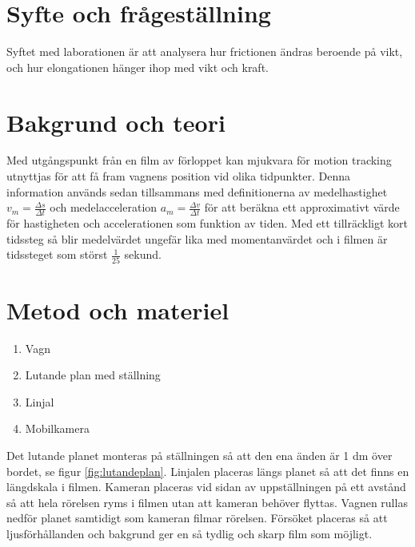 \documentclass[11p, titlepage, oneside, a4paper]{article}
\begin{document}
	\newpage

	
	\setlength{\parindent}{0pt}
	\setlength{\parskip}{10pt}
	
	\section{Syfte och frågeställning}
		Syftet med laborationen är att analysera hur frictionen ändras beroende på vikt, och hur elongationen hänger ihop med vikt och kraft.

	\section{Bakgrund och teori}
        Med utgångspunkt från en film av förloppet kan mjukvara för motion tracking utnyttjas för att få fram vagnens position vid olika tidpunkter. Denna information används sedan tillsammans med definitionerna av medelhastighet $v_m = \frac{\Delta s}{\Delta t}$ och medelacceleration $a_m = \frac{\Delta v}{\Delta t}$ för att beräkna ett approximativt värde för hastigheten och accelerationen som funktion av tiden. Med ett tillräckligt kort tidssteg så blir medelvärdet ungefär lika med momentanvärdet och i filmen är tidssteget som störst $\frac{1}{25}$ sekund.  \parencite{impuls}
	

	\section{Metod och materiel}
        \begin{enumerate}
            \item Vagn
            \item Lutande plan med ställning
            \item Linjal
            \item Mobilkamera
        \end{enumerate}
        
        Det lutande planet monteras på ställningen så att den ena änden är 1 dm över bordet, se figur \ref{fig:lutandeplan}. Linjalen placeras längs planet så att det finns en längdskala  i filmen. Kameran placeras vid sidan av uppställningen på ett avstånd så att hela rörelsen ryms i filmen utan att kameran behöver flyttas. Vagnen rullas nedför planet samtidigt som kameran filmar rörelsen. Försöket placeras så att ljusförhållanden och bakgrund ger en så tydlig och skarp film som möjligt.
        
\end{document}
